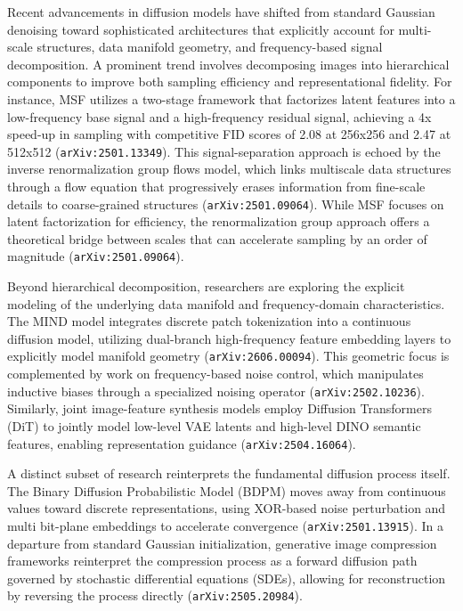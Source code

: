 \documentclass[11pt]{article}
\begin{document}
Recent advancements in diffusion models have shifted from standard Gaussian denoising toward sophisticated architectures that explicitly account for multi-scale structures, data manifold geometry, and frequency-based signal decomposition. A prominent trend involves decomposing images into hierarchical components to improve both sampling efficiency and representational fidelity. For instance, MSF utilizes a two-stage framework that factorizes latent features into a low-frequency base signal and a high-frequency residual signal, achieving a 4x speed-up in sampling with competitive FID scores of 2.08 at 256x256 and 2.47 at 512x512 (\texttt{arXiv:2501.13349}). This signal-separation approach is echoed by the inverse renormalization group flows model, which links multiscale data structures through a flow equation that progressively erases information from fine-scale details to coarse-grained structures (\texttt{arXiv:2501.09064}). While MSF focuses on latent factorization for efficiency, the renormalization group approach offers a theoretical bridge between scales that can accelerate sampling by an order of magnitude (\texttt{arXiv:2501.09064}).

Beyond hierarchical decomposition, researchers are exploring the explicit modeling of the underlying data manifold and frequency-domain characteristics. The MIND model integrates discrete patch tokenization into a continuous diffusion model, utilizing dual-branch high-frequency feature embedding layers to explicitly model manifold geometry (\texttt{arXiv:2606.00094}). This geometric focus is complemented by work on frequency-based noise control, which manipulates inductive biases through a specialized noising operator (\texttt{arXiv:2502.10236}). Similarly, joint image-feature synthesis models employ Diffusion Transformers (DiT) to jointly model low-level VAE latents and high-level DINO semantic features, enabling representation guidance (\texttt{arXiv:2504.16064}).

A distinct subset of research reinterprets the fundamental diffusion process itself. The Binary Diffusion Probabilistic Model (BDPM) moves away from continuous values toward discrete representations, using XOR-based noise perturbation and multi bit-plane embeddings to accelerate convergence (\texttt{arXiv:2501.13915}). In a departure from standard Gaussian initialization, generative image compression frameworks reinterpret the compression process as a forward diffusion path governed by stochastic differential equations (SDEs), allowing for reconstruction by reversing the process directly (\texttt{arXiv:2505.20984}).
\end{document}
